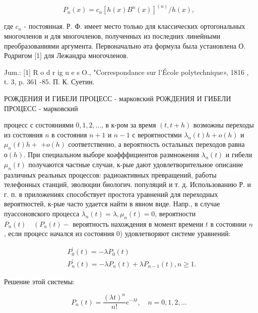 \documentclass[10pt]{article}
\begin{document}
\[

P_{n}(x)=c_{n}\left[h(x) B^{n}(x)\right]^{(n)} / h(x),

\]



где $c_{n}$ - постоянная. Р. Ф. имеет место только для классических ортогональных многочленов и для многочленов, полученных из последних линейными преобразованиями аргумента. Первоначально әта формула была установлена О. Родригом [1] для Лежандра многочленов.



Jum.: [1] R o d r ig u e s O., "Correspondance sur l'École polytechnique», 1816 , t. 3, p. 361 -85. П. К. Суетин.

РОЖДЕНИЯ И ГИБЕЈИ ПРОЦЕСС - марковский РОЖДЕНИЯ И ГИБЕЛИ ПРОЦЕСС - марковский

процесс с состояниями $0,1,2, \ldots$, в к-ром за время $(t, t+h)$ возможны переходы из состояния $n$ в состояния $n+1$ и $n-1$ с вероятностями $\lambda_{n}(t) h+o(h)$ и $\mu_{n}(t) h+$ $+o(h)$ соответственно, а вероятность остальных переходов равна $о(h)$. При специальном выборе коәфффициентов размножения $\lambda_{n}(t)$ и гибели $\mu_{n}(t)$ получаются частные случаи, к-рые дают удовлетворительное описание различных реальных процессов: радиоактивных превращений, работы телефонных станций, эволюции биологич. популяций и т. д. Использованию Р. и г. п. в приложениях способствует простота уравнений для переходных вероятностей, к-рые часто удается найти в явном виде. Напр., в случае пуассоновского процесса $\lambda_{n}(t)=\lambda, \mu_{n}(t)=0$, вероятности $P_{n}(t) \quad\left(P_{n}(t)-\right.$ вероятность нахождения в момент времени $t$ в состоянии $n$, если процесс начался из состояния 0) удовлетворяют системе уравнений:



\[

\begin{aligned}

& P_{0}^{\prime}(t)=-\lambda P_{0}(t) \\

& P_{n}^{\prime}(t)=-\lambda P_{n}(t)+\lambda P_{n-1}(t), n \geqslant 1 .

\end{aligned}

\]



Решение этой системы:



\[

P_{n}(t)=\frac{(\lambda t)^{n}}{n !} e^{-\lambda t}, \quad n=0,1,2, \ldots

\]
\end{document}
